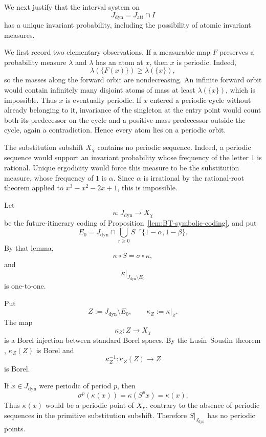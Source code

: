 \documentclass[11pt]{amsart}
\theoremstyle{plain}
\theoremstyle{definition}
\theoremstyle{remark}
\begin{document}
We next justify that the interval system on
\[
        J_{\mathrm{dyn}}=J_{\mathrm{att}}\cap I
\]
has a unique invariant probability, including the possibility of atomic invariant measures.

We first record two elementary observations. If a measurable map \(F\) preserves a
probability measure \(\lambda\) and \(\lambda\) has an atom at \(x\), then \(x\) is periodic.
Indeed,
\[
        \lambda(\{F(x)\})\geq\lambda(\{x\}),
\]
so the masses along the forward orbit are nondecreasing. An infinite forward orbit would
contain infinitely many disjoint atoms of mass at least \(\lambda(\{x\})\), which is
impossible. Thus \(x\) is eventually periodic. If \(x\) entered a periodic cycle without
already belonging to it, invariance of the singleton at the entry point would count both its
predecessor on the cycle and a positive-mass predecessor outside the cycle, again a
contradiction. Hence every atom lies on a periodic orbit.

The substitution subshift \(X_\chi\) contains no periodic sequence. Indeed, a periodic
sequence would support an invariant probability whose frequency of the letter \(1\) is
rational. Unique ergodicity would force this measure to be the substitution measure, whose
frequency of \(1\) is \(\alpha\). Since \(\alpha\) is irrational by the rational-root theorem
applied to \(x^3-x^2-2x+1\), this is impossible.

Let
\[
        \kappa:J_{\mathrm{dyn}}\longrightarrow X_\chi
\]
be the future-itinerary coding of
Proposition~\ref{lem:BT-symbolic-coding}, and put
\[
        E_0
        =
        J_{\mathrm{dyn}}
        \cap
        \bigcup_{r\geq0}
        S^{-r}\{1-\alpha,1-\beta\}.
\]
By that lemma,
\[
        \kappa\circ S=\sigma\circ\kappa,
\]
and
\[
        \kappa|_{J_{\mathrm{dyn}}\setminus E_0}
\]
is one-to-one.

Put
\[
        Z:=J_{\mathrm{dyn}}\setminus E_0,
        \qquad
        \kappa_Z:=\kappa|_Z.
\]
The map
\[
        \kappa_Z:Z\longrightarrow X_\chi
\]
is a Borel injection between standard Borel spaces. By the
Lusin--Souslin theorem \cite{Kechris1995}, \(\kappa_Z(Z)\) is Borel and
\[
        \kappa_Z^{-1}:\kappa_Z(Z)\longrightarrow Z
\]
is Borel.

If \(x\in J_{\mathrm{dyn}}\) were periodic of period \(p\), then
\[
        \sigma^p(\kappa(x))
        =
        \kappa(S^p x)
        =
        \kappa(x).
\]
Thus \(\kappa(x)\) would be a periodic point of \(X_\chi\), contrary to the
absence of periodic sequences in the primitive substitution subshift.
Therefore \(S|_{J_{\mathrm{dyn}}}\) has no periodic points.
\end{document}

